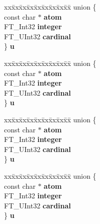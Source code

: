 \begin{DoxyCompactItemize}
\begin{tabbing}
\end{tabbing}\item 
\mbox{\label{structBDF__PropertyRec___a4d2e051890fe0f1f287e930903f09de0}} 
\begin{tabbing}
xx\=xx\=xx\=xx\=xx\=xx\=xx\=xx\=xx\=\kill
union \{\\
\>const char $\ast$ {\bfseries atom}\\
\>FT\_Int32 {\bfseries integer}\\
\>FT\_UInt32 {\bfseries cardinal}\\
\} {\bfseries u}\\

\end{tabbing}\item 
\mbox{\label{structBDF__PropertyRec___a727b0e60847f890a79705123e78e2b1a}} 
\begin{tabbing}
xx\=xx\=xx\=xx\=xx\=xx\=xx\=xx\=xx\=\kill
union \{\\
\>const char $\ast$ {\bfseries atom}\\
\>FT\_Int32 {\bfseries integer}\\
\>FT\_UInt32 {\bfseries cardinal}\\
\} {\bfseries u}\\

\end{tabbing}\item 
\mbox{\label{structBDF__PropertyRec___a597e33980995ccf91aaf1401d7fbdb7c}} 
\begin{tabbing}
xx\=xx\=xx\=xx\=xx\=xx\=xx\=xx\=xx\=\kill
union \{\\
\>const char $\ast$ {\bfseries atom}\\
\>FT\_Int32 {\bfseries integer}\\
\>FT\_UInt32 {\bfseries cardinal}\\
\} {\bfseries u}\\

\end{tabbing}\item 
\mbox{\label{structBDF__PropertyRec___a54c8c581ea5714f15ddfea3c2359804d}} 
\begin{tabbing}
xx\=xx\=xx\=xx\=xx\=xx\=xx\=xx\=xx\=\kill
union \{\\
\>const char $\ast$ {\bfseries atom}\\
\>FT\_Int32 {\bfseries integer}\\
\>FT\_UInt32 {\bfseries cardinal}\\
\} {\bfseries u}\\


\end{tabbing}
\end{DoxyCompactItemize}
